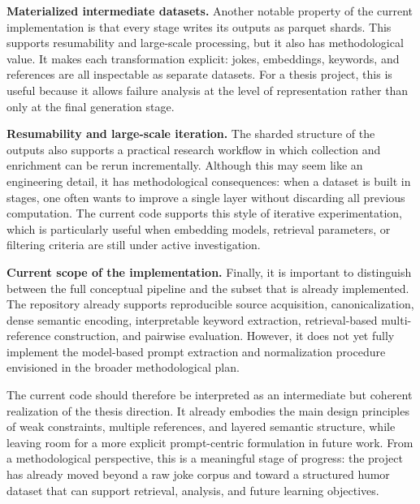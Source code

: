 \documentclass[12pt]{extarticle}
\begin{document}
\textbf{Materialized intermediate datasets.} Another notable property of the current implementation is that every stage writes its outputs as parquet shards. This supports resumability and large-scale processing, but it also has methodological value. It makes each transformation explicit: jokes, embeddings, keywords, and references are all inspectable as separate datasets. For a thesis project, this is useful because it allows failure analysis at the level of representation rather than only at the final generation stage.

\textbf{Resumability and large-scale iteration.} The sharded structure of the outputs also supports a practical research workflow in which collection and enrichment can be rerun incrementally. Although this may seem like an engineering detail, it has methodological consequences: when a dataset is built in stages, one often wants to improve a single layer without discarding all previous computation. The current code supports this style of iterative experimentation, which is particularly useful when embedding models, retrieval parameters, or filtering criteria are still under active investigation.

\textbf{Current scope of the implementation.} Finally, it is important to distinguish between the full conceptual pipeline and the subset that is already implemented. The repository already supports reproducible source acquisition, canonicalization, dense semantic encoding, interpretable keyword extraction, retrieval-based multi-reference construction, and pairwise evaluation. However, it does not yet fully implement the model-based prompt extraction and normalization procedure envisioned in the broader methodological plan.

The current code should therefore be interpreted as an intermediate but coherent realization of the thesis direction. It already embodies the main design principles of weak constraints, multiple references, and layered semantic structure, while leaving room for a more explicit prompt-centric formulation in future work. From a methodological perspective, this is a meaningful stage of progress: the project has already moved beyond a raw joke corpus and toward a structured humor dataset that can support retrieval, analysis, and future learning objectives.
\end{document}
